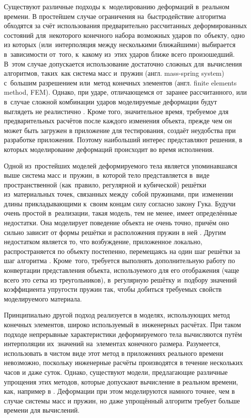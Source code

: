 \documentclass[a4paper, 14pt, titlepage]{extarticle}
\begin{document}
    Существуют различные подходы к~моделированию деформаций в~реальном времени. В простейшем случае
    ограничения на~быстродействие алгоритма обходятся за счёт использования предварительно рассчитанных
    деформированных состояний для~некоторого конечного набора возможных ударов по~объекту, одно из которых
    (или~интерполяция между несколькими ближайшими) выбирается в~зависимости от~того, к~какому
    из~этих ударов ближе всего произошедший. В~этом случае допускается использование достаточно сложных
    для~вычисления алгоритмов, таких~как система масс и~пружин (англ. {\English mass-spring system})
    с~большим разрешением или~метод конечных элементов (англ. {\English finite elements method, FEM}).
    Однако, при ударе, отличающемся от~заранее рассчитанного, или в~случае сложной комбинации ударов
    моделируемые деформации будут выглядеть не реалистично \cite[с.~1064]{chang-crash}. Кроме того, значительное время, требуемое
    для предварительных расчётов после каждого изменения объекта, прежде чем он может быть загружен
    в приложение для тестирования, создаёт неудобства при разработке приложения. Поэтому наибольший
    интерес представляют решения, в которых моделирование деформаций происходит во время исполнения.

    Одной из~простейших моделей деформируемого тела является упоминавшаяся выше система масс
    и~пружин, в~которой тело представляется в~виде пространственной (как~правило, регулярной и
    кубической) решётки из~материальных точек, связанных между~собой пружинами, при~изменении длины
    прикладывающими к~своим концам силу согласно закону Гука. Будучи очень простой в~реализации,
    такая модель, тем не менее, имеет определённые недостатки. Она моделирует поведение объекта не
    очень точно, причём оно сильно зависит от формы решётки и расположения пружин в ней \cite[с.~8]{mueller-physmodels}.
    Другим недостатком является то, что возбуждение, приложенное локально, распространяется по
    объекту постепенно, перемещаясь на один шаг решётки за шаг алгоритма \cite[с.~232]{parent-animation}.
    Кроме~того, требуется выполнять дополнительную работу по конвертации представления объекта,
    используемого для его отображения (чаще всего это сетка из треугольников), в~регулярную решётку
    и~подбору значений коэффициента упругости пружин так, чтобы добиться требуемых свойств
    моделируемого материала.

    Принципиально другой подход реализуется в моделях, использующих метод конечных элементов, широко
    используемый в~инженерных расчётах. При таком подходе
    непрерывные характеристики деформируемого тела вычисляются путём интерполяции их~значений
    на~элементах конечного размера. Разумеется, использовать в чистом виде этот метод
    в приложениях реального времени невозможно, поскольку инженерные расчёты производятся в
    течение нескольких часов и даже суток. Однако, существуют модели, предлагающие различные упрощения этих
    методов, которые допускают вычисление в реальном времени, как, например в \cite{mueller-stable}.
    Деформации при этом моделируются намного точнее, чем в случае системы масс и пружин, но даже
    упрощённый алгоритм требует больше времени для вычислений.
\end{document}
